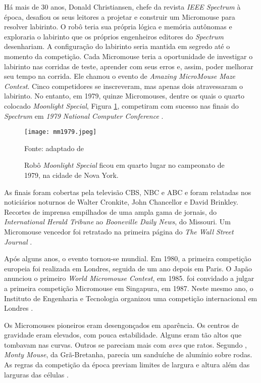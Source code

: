 Há mais de 30 anos, Donald Christiansen, chefe da revista \emph{IEEE Spectrum} à época, desafiou os seus leitores a projetar e construir um Micromouse para resolver labirinto. O robô teria sua própria lógica e memória autônomas e exploraria o labirinto que os próprios engenheiros editores do \emph{Spectrum} desenhariam. A configuração do labirinto seria mantida em segredo até o momento da competição. Cada Micromouse teria a oportunidade de investigar o labirinto nas corridas de teste, aprender com seus erros e, assim, poder melhorar seu tempo na corrida. Ele chamou o evento de \emph{Amazing MicroMouse Maze Contest}. Cinco competidores se inscreveram, mas apenas dois atravessaram o labirinto. No entanto, em 1979, quinze Micromouses, dentre os quais o quarto colocado \emph{Moonlight Special}, Figura \ref{fig:MM}, competiram com sucesso nas finais do \emph{Spectrum} em \emph{1979 National Computer Conference} \cite{Christian:2014}.

\begin{figure}[!htb]
	\caption{\label{fig:MM}Robô \emph{Moonlight Special} ficou em quarto lugar no campeonato de 1979, na cidade de Nova York.}
	\begin{center}
		\texttt{[image: mm1979.jpeg]}
	\end{center}
	\centering
	\small Fonte: adaptado de 
\end{figure}

\begin{citacao}

As finais foram cobertas pela televisão CBS, NBC e ABC e foram relatadas nos noticiários noturnos de Walter Cronkite, John Chancellor e David Brinkley. Recortes de imprensa empilhados de uma ampla gama de jornais, do \emph{International Herald Tribune} ao \emph{Booneville Daily News}, do Missouri. Um Micromouse vencedor foi retratado na primeira página do \emph{The Wall Street Journal} \cite[p. -8]{Christian:2014}.
\end{citacao}

Após alguns anos, o evento tornou-se mundial. Em 1980, a primeira competição europeia foi realizada em Londres, seguida de um ano depois em Paris. O Japão anunciou o primeiro \emph{World Micromouse Contest}, em 1985.  foi convidado a julgar a primeira competição Micromouse em Singapura, em 1987. Neste mesmo ano, o Instituto de Engenharia e Tecnologia organizou uma competição internacional em Londres \cite{Christian:2014}.

Os Micromouses pioneiros eram desengonçados em aparência. Os centros de gravidade eram elevados, com pouca estabilidade. Alguns eram tão altos que tombavam nas curvas. Outros se pareciam mais com \emph{aves} que ratos. Segundo , \emph{Monty Mouse}, da Grã-Bretanha, parecia um sanduíche de alumínio sobre rodas. As regras da competição da época previam limites de largura e altura além das larguras das células \cite{Christian:2014}.

